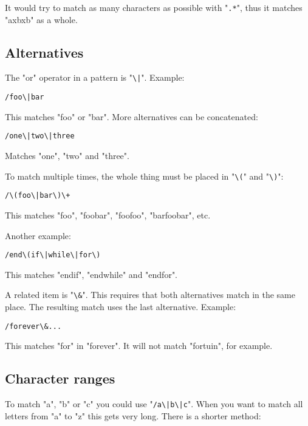 It would try to match as many characters as possible with "\texttt{.*}", thus it matches "axbxb" as a whole.
\subsection{Alternatives}
The "or" operator in a pattern is "\texttt{\textbackslash{}|}".
Example:

\begin{Verbatim}[samepage=true]
 /foo\|bar
\end{Verbatim}

This matches "foo" or "bar".
More alternatives can be concatenated:

\begin{Verbatim}[samepage=true]
 /one\|two\|three
\end{Verbatim}

Matches "one", "two" and "three".

To match multiple times, the whole thing must be placed in "\texttt{\textbackslash{}(}" and "\texttt{\textbackslash{})}":

\begin{Verbatim}[samepage=true]
 /\(foo\|bar\)\+
\end{Verbatim}

This matches "foo", "foobar", "foofoo", "barfoobar", etc.

Another example:

\begin{Verbatim}[samepage=true]
 /end\(if\|while\|for\)
\end{Verbatim}

This matches "endif", "endwhile" and "endfor".

A related item is "\texttt{\textbackslash{}\&}".
This requires that both alternatives match in the same place.
The resulting match uses the last alternative.
Example:

\begin{Verbatim}[samepage=true]
 /forever\&...
\end{Verbatim}

This matches "for" in "forever".  It will not match "fortuin", for example.
\subsection{Character ranges}
To match "a", "b" or "c" you could use "\texttt{/a\textbackslash{}|b\textbackslash{}|c}".
When you want to match all letters from "a" to "z" this gets very long.
There is a shorter method:

